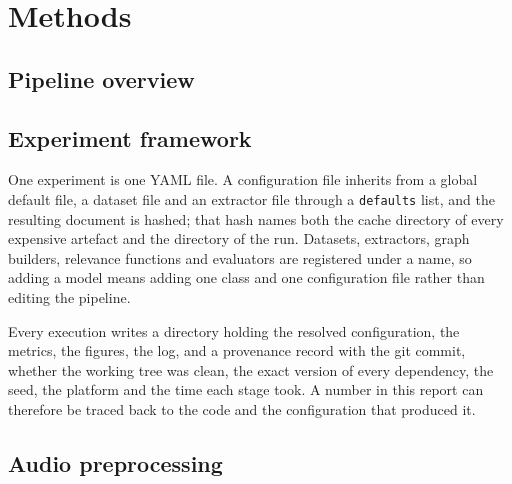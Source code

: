 \chapter{Methods}
\label{cap:methods}


\section{Pipeline overview}
\label{sec:pipeline}


\section{Experiment framework}
\label{sec:framework}

One experiment is one YAML file. A configuration file inherits from a global
default file, a dataset file and an extractor file through a \texttt{defaults}
list, and the resulting document is hashed; that hash names both the cache
directory of every expensive artefact and the directory of the run. Datasets,
extractors, graph builders, relevance functions and evaluators are registered
under a name, so adding a model means adding one class and one configuration
file rather than editing the pipeline.

Every execution writes a directory holding the resolved configuration, the
metrics, the figures, the log, and a provenance record with the git commit,
whether the working tree was clean, the exact version of every dependency, the
seed, the platform and the time each stage took. A number in this report can
therefore be traced back to the code and the configuration that produced it.

\section{Audio preprocessing}
\label{sec:audio}


